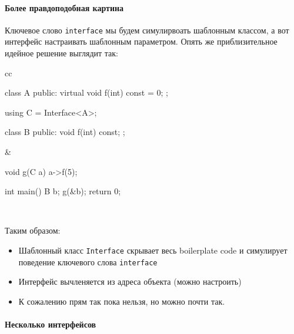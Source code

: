 \paragraph{Более правдоподобная картина}

Ключевое слово \texttt{interface} мы будем симулирвоать шаблонным классом, а вот интерфейс настраивать шаблонным параметром.
Опять же приблизительное идейное решение выглядит так:
\begin{center}
\begin{tabular}{cc}
{
\begin{minipage}[\baselineskip]{6cm}
\begin{cppcode}[numbers = none]
class A {
public:
  virtual void f(int) const = 0;
};

using C = Interface<A>;

class B {
public:
   void f(int) const;
};
\end{cppcode}
\end{minipage}
}&{
\begin{minipage}[\baselineskip]{4cm}
\begin{cppcode}[numbers = none]

void g(C a) {
  a->f(5);
}

int main() {
  B b;
  g(&b);
  return 0;
}

\end{cppcode}
\end{minipage}
}\\
\end{tabular}
\end{center}
Таким образом:
\begin{itemize}
\item Шаблонный класс \texttt{Interface} скрывает весь boilerplate code и симулирует поведение ключевого слова \texttt{interface}

\item Интерфейс вычленяется из адреса объекта (можно настроить)

\item К сожалению прям так пока нельзя, но можно почти так.
\end{itemize}

\paragraph{Несколько интерфейсов}

